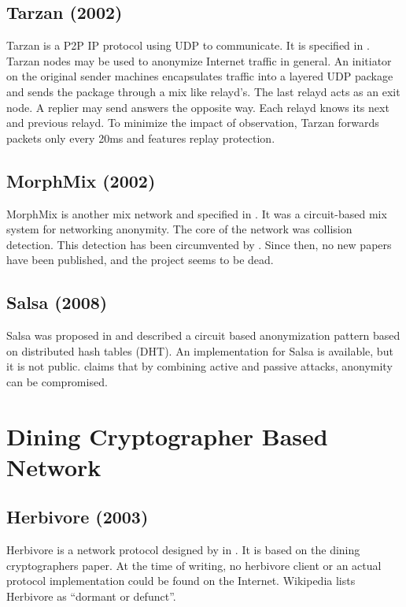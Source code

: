 \subsection{Tarzan (2002)}
Tarzan is a P2P IP protocol using UDP to communicate. It is specified in \cite{tarzan:ccs02}. Tarzan nodes may be used to anonymize Internet traffic in general. An initiator on the original sender machines encapsulates traffic into a layered UDP package and sends the package through a mix like relayd's. The last relayd acts as an exit node. A replier may send answers the opposite way. Each relayd knows its next and previous relayd. To minimize the impact of observation, Tarzan forwards packets only every 20ms and features replay protection.

\subsection{MorphMix (2002)}
MorphMix is another mix network and specified in \cite{morphmix:wpes2002}. It was a circuit-based mix system for networking anonymity. The core of the network was collision detection. This detection has been circumvented by \cite{morphmix:pet2006}. Since then, no new papers have been published, and the project seems to be dead.

\subsection{Salsa (2008)}
Salsa was proposed in \cite{Salsa} and described a circuit based anonymization pattern based on distributed hash tables (DHT). An implementation for Salsa is available, but it is not public. \cite{ccs2008:mittal} claims that by combining active and passive attacks, anonymity can be compromised.

\section{Dining Cryptographer Based Network}
\subsection{Herbivore (2003)}
Herbivore is a network protocol designed by \citeauthor{herbivore:tr} in \cite{herbivore:tr}. It is based on the dining cryptographers paper\cite{chaum-dc}. At the time of writing, no herbivore client or an actual protocol implementation could be found on the Internet. Wikipedia lists Herbivore as ``dormant or defunct''.

